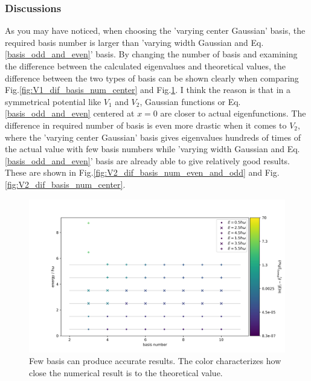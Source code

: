 \documentclass{article}
\begin{document}
\subsubsection{Discussions}
\label{sec:discussion}
As you may have noticed, when choosing the 'varying center Gaussian' basis, the required basis number is larger than 'varying width Gaussian and Eq.\ref{basis_odd_and_even}' basis. By changing the number of basis and examining the difference between the calculated eigenvalues and theoretical values, the difference between the two types of basis can be shown clearly when comparing Fig.\ref{fig:V1_dif_basis_num_center}
and Fig.\ref{fig:V1_dif_basis_num_even_and_odd}. I think the reason is that in a symmetrical potential like $V_1$ and $V_2$, Gaussian functions or Eq.\ref{basis_odd_and_even} centered at $x=0$ are closer to actual eigenfunctions. The difference in required number of basis is even more drastic when it comes to $V_2$, where the 'varying center Gaussian' basis gives eigenvalues hundreds of times of the actual value with few basis numbers while 'varying width Gaussian and Eq.\ref{basis_odd_and_even}' basis are already able to give relatively good results. These are shown in Fig.\ref{fig:V2_dif_basis_num_even_and_odd} and Fig.\ref{fig:V2_dif_basis_num_center}.
\begin{figure}[!htb]
    \centering
    \includegraphics[width=1\textwidth]{V_1_enven_and_odd-different basis number.png}
    \caption{Few basis can produce accurate results. The color characterizes how close the numerical result is to the theoretical value.}
    \label{fig:V1_dif_basis_num_even_and_odd}
\end{figure}
\end{document}
